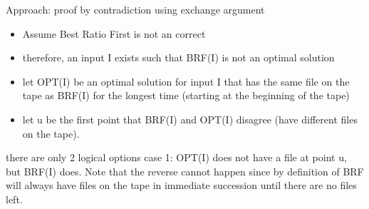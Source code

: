 \documentclass[a4paper]{article}
\begin{document}
Approach: proof by contradiction using exchange argument

\begin{itemize}
    \item Assume Best Ratio First is not an correct
    \item therefore, an input I exists such that BRF(I) is not an optimal solution
    \item let OPT(I) be an optimal solution for input I that has the same file on the tape as BRF(I) for the longest time (starting at the beginning of the tape)
    \item let u be the first point that BRF(I) and OPT(I) disagree (have different files on the tape).
\end{itemize}

there are only 2 logical options
case 1: OPT(I) does not have a file at point u, but BRF(I) does. Note that the reverse cannot happen since by definition of BRF will always have files on the tape in immediate succession until there are no files left.
\end{document}
